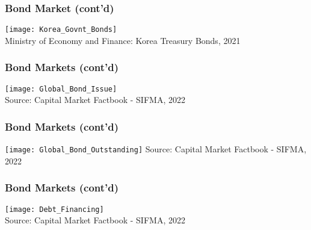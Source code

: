 \documentclass[10pt]{beamer}
\begin{document}
	
	
	
	\begin{frame}
		\frametitle{Bond Market (cont'd)}
		
		\begin{center}
			\texttt{[image: Korea\_Govnt\_Bonds]} \\
			{\scriptsize Ministry of Economy and Finance: Korea Treasury Bonds, 2021}
		\end{center}
		
		
	\end{frame}
	
	
	
	
	\begin{frame}
		\frametitle{Bond Markets (cont'd)} %
		\begin{center}
			\texttt{[image: Global\_Bond\_Issue]} \\
			{\scriptsize Source: Capital Market Factbook - SIFMA, 2022}		
		\end{center}
		
	\end{frame}	
	
	
	
	\begin{frame}
		\frametitle{Bond Markets (cont'd)} %
		\begin{center}
			\texttt{[image: Global\_Bond\_Outstanding]}
			{\scriptsize Source: Capital Market Factbook - SIFMA, 2022}		
		\end{center}
		
	\end{frame}	
	
	
	\begin{frame}
		\frametitle{Bond Markets (cont'd)} %
		\begin{center}
			\texttt{[image: Debt\_Financing]} \\
			{\scriptsize Source: Capital Market Factbook - SIFMA, 2022}		
		\end{center}
		
	\end{frame}	
	
	
	
\end{document}
